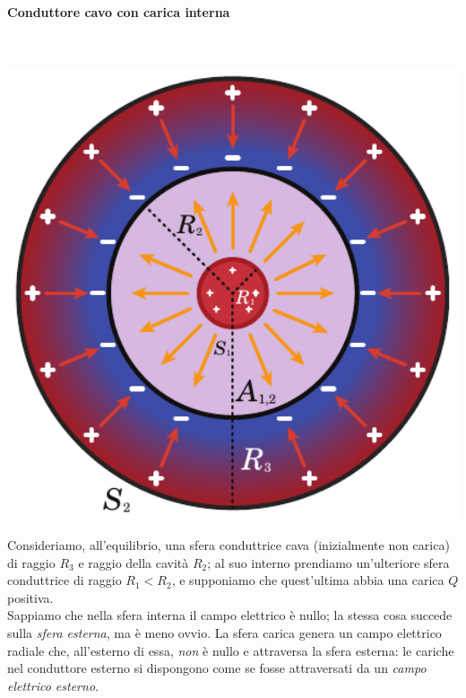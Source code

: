 \paragraph{Conduttore cavo con carica interna}~\\
\begin{minipage}{0.43\textwidth}
\begin{center}
	\includegraphics[width=1\textwidth]{images/chp4/chp4sferacavaconsfera.pdf}
\end{center}
\end{minipage}\hspace{10pt}
\begin{minipage}{0.56\textwidth}
Consideriamo, all'equilibrio, una sfera conduttrice cava (inizialmente non carica) di raggio $R_3$ e raggio della cavità $R_2$; al suo interno prendiamo un'ulteriore sfera conduttrice di raggio $R_1<R_2$, e supponiamo che quest'ultima abbia una carica $Q$ positiva.\\
Sappiamo che nella sfera interna il campo elettrico è nullo; la stessa cosa succede sulla \textit{sfera esterna}, ma è meno ovvio.	La sfera carica genera un campo elettrico radiale che, all'esterno di essa, \textit{non} è nullo e attraversa la sfera esterna: le cariche nel conduttore esterno si dispongono come se fosse attraversati da un \textit{campo elettrico esterno}.
\end{minipage}\\
